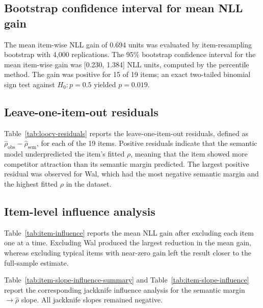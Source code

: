 \documentclass[11pt,final]{article}
\begin{document}
\subsection{Bootstrap confidence interval for mean NLL gain}

The mean item-wise NLL gain of 0.694 units was evaluated by item-resampling bootstrap with 4,000 replications. The 95\% bootstrap confidence interval for the mean item-wise gain was [0.230, 1.384] NLL units, computed by the percentile method. The gain was positive for 15 of 19 items; an exact two-tailed binomial sign test against $H_0: p = 0.5$ yielded $p = 0.019$.



\subsection{Leave-one-item-out residuals}

Table~\ref{tab:loocv-residuals} reports the leave-one-item-out residuals, defined as $\hat{\rho}_{\mathrm{obs}} - \hat{\rho}_{\mathrm{sem}}$, for each of the 19 items. Positive residuals indicate that the semantic model underpredicted the item's fitted $\rho$, meaning that the item showed more competitor attraction than its semantic margin predicted. The largest positive residual was observed for Wal, which had the most negative semantic margin and the highest fitted $\rho$ in the dataset.



\subsection{Item-level influence analysis}

Table~\ref{tab:item-influence} reports the mean NLL gain after excluding each item one at a time. Excluding Wal produced the largest reduction in the mean gain, whereas excluding typical items with near-zero gain left the result closer to the full-sample estimate.



Table~\ref{tab:item-slope-influence-summary} and Table~\ref{tab:item-slope-influence} report the corresponding jackknife influence analysis for the semantic margin $\rightarrow \hat{\rho}$ slope. All jackknife slopes remained negative.


\end{document}
